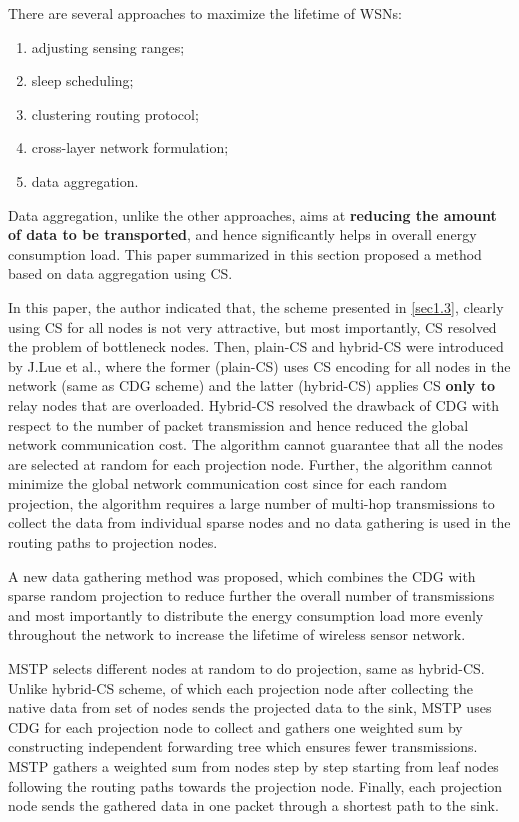 There are several approaches to maximize the lifetime of WSNs:
\begin{enumerate}
    \item adjusting sensing ranges;
    \item sleep scheduling;
    \item clustering routing protocol;
    \item cross-layer network formulation;
    \item data aggregation. 
\end{enumerate}
Data aggregation, unlike the other approaches, aims at \textbf{\textcolor[rgb]{1,0,0}{reducing the amount of data to be transported}}, and hence significantly helps in overall energy consumption load. This paper summarized in this section proposed a method based on data aggregation using CS. 

In this paper, the author indicated that, the scheme presented in \cref{sec1.3}, clearly using CS for all nodes is not very attractive, but most importantly, CS resolved the problem of bottleneck nodes. Then, \textcolor[rgb]{1,0,0}{plain-CS and hybrid-CS} were introduced by J.Lue et al., where the former (plain-CS) uses CS encoding for all nodes in the network (same as CDG scheme) and the latter (hybrid-CS) applies CS \textbf{\textcolor[rgb]{1,0,0}{only to}} \textcolor[rgb]{1,0,0}{relay nodes that are overloaded}. Hybrid-CS resolved the drawback of CDG with respect to the number of packet transmission and hence reduced the global network communication cost. The algorithm cannot guarantee that all the nodes are selected at random for each projection node. Further, \textcolor[rgb]{0,0,1}{the algorithm cannot minimize the global network communication cost since for each random projection, the algorithm requires a large number of multi-hop transmissions to collect the data from individual sparse nodes and no data gathering is used in the routing paths to projection nodes}.

A new data gathering method was proposed, which combines the CDG with sparse random projection to reduce further the overall number of transmissions and most importantly to distribute the energy consumption load more evenly throughout the network to increase the lifetime of wireless sensor network. 

MSTP selects different nodes at random to do projection, same as hybrid-CS. Unlike hybrid-CS scheme, of which each projection node after collecting the native data from set of nodes sends the projected data to the sink, MSTP uses CDG for each projection node to collect and gathers one weighted sum by constructing independent forwarding tree which ensures fewer transmissions. MSTP gathers a weighted sum from nodes step by step starting from leaf nodes following the routing paths towards the projection node. Finally, each projection node sends the gathered data in one packet through a shortest path to the sink. 

